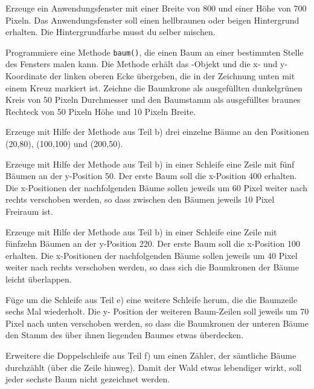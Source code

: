 \begin{compactenum}[a)]
\item Erzeuge ein Anwendungsfenster mit einer Breite von 800 und einer Höhe von
700 Pixeln. Das Anwendungsfenster soll einen hellbraunen oder beigen
Hintergrund erhalten. Die Hintergrundfarbe musst du selber mischen.
\item Programmiere eine Methode \lstinline|baum()|, die einen Baum an einer
bestimmten Stelle des Fensters malen kann. Die Methode erhält das
-Objekt und die x- und y-Koordinate der linken oberen Ecke
übergeben, die in der Zeichnung unten mit einem Kreuz markiert ist. Zeichne die
Baumkrone als ausgefüllten dunkelgrünen Kreis von 50 Pixeln Durchmesser und den
Baumstamm als ausgefülltes braunes Rechteck von 50 Pixeln Höhe und 10 Pixeln
Breite.
\item Erzeuge mit Hilfe der Methode aus Teil b) drei einzelne Bäume an den
 Positionen (20,80), (100,100) und (200,50).
\item Erzeuge mit Hilfe der Methode aus Teil b) in einer Schleife eine Zeile mit
fünf Bäumen an der y-Position 50. Der erste Baum soll die x-Position 400
erhalten. Die x-Positionen der nachfolgenden Bäume sollen jeweils um 60 Pixel
weiter nach rechts verschoben werden, so dass zwischen den Bäumen jeweils 10
Pixel Freiraum ist.
\item Erzeuge mit Hilfe der Methode aus Teil b) in einer Schleife eine Zeile mit
fünfzehn Bäumen an der y-Position 220. Der erste Baum soll die x-Position 100
erhalten. Die x-Positionen der nachfolgenden Bäume sollen jeweils um 40 Pixel
weiter nach rechts verschoben werden, so dass sich die Baumkronen der Bäume
leicht überlappen.
\item Füge um die Schleife aus Teil e) eine weitere Schleife herum, die die
Baumzeile sechs Mal wiederholt. Die y- Position der weiteren Baum-Zeilen soll
jeweils um 70 Pixel nach unten verschoben werden, so dass die Baumkronen der
unteren Bäume den Stamm des über ihnen liegenden Baumes etwas überdecken.
\item Erweitere die Doppelschleife aus Teil f) um einen Zähler, der sämtliche
Bäume durchzählt (über die Zeile hinweg). Damit der Wald etwas lebendiger
wirkt, soll jeder sechste Baum nicht gezeichnet werden.
\end{compactenum}

